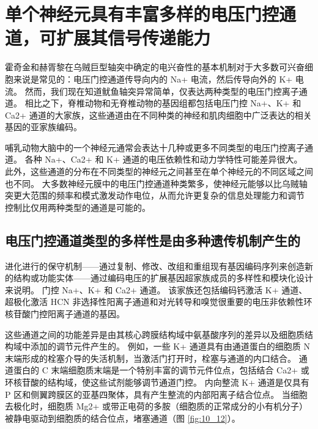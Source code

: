 \section{单个神经元具有丰富多样的电压门控通道，可扩展其信号传递能力}

霍奇金和赫胥黎在乌贼巨型轴突中确定的电兴奋性的基本机制对于大多数可兴奋细胞来说是常见的：电压门控通道传导向内的 Na+ 电流，然后传导向外的 K+ 电流。 
然而，我们现在知道鱿鱼轴突异常简单，仅表达两种类型的电压门控离子通道。 
相比之下，脊椎动物和无脊椎动物的基因组都包括电压门控 Na+、K+ 和 Ca2+ 通道的大家族，这些通道由在不同种类的神经和肌肉细胞中广泛表达的相关基因的亚家族编码。


哺乳动物大脑中的一个神经元通常会表达十几种或更多不同类型的电压门控离子通道。 
各种 Na+、Ca2+ 和 K+ 通道的电压依赖性和动力学特性可能差异很大。 
此外，这些通道的分布在不同类型的神经元之间甚至在单个神经元的不同区域之间也不同。 
大多数神经元膜中的电压门控通道种类繁多，使神经元能够以比乌贼轴突更大范围的频率和模式激发动作电位，从而允许更复杂的信息处理能力和调节 控制比仅用两种类型的通道是可能的。



\subsection{电压门控通道类型的多样性是由多种遗传机制产生的}
进化进行的保守机制——通过复制、修改、改组和重组现有基因编码序列来创造新的结构或功能实体——通过编码电压的扩展基因超家族成员的多样性和模块化设计来说明。 
门控 Na+、K+ 和 Ca2+ 通道。 该家族还包括编码钙激活 K+ 通道、超极化激活 HCN 非选择性阳离子通道和对光转导和嗅觉很重要的电压非依赖性环核苷酸门控阳离子通道的基因。


这些通道之间的功能差异是由其核心跨膜结构域中氨基酸序列的差异以及细胞质结构域中添加的调节元件产生的。 
例如，一些 K+ 通道具有由通道蛋白的细胞质 N 末端形成的栓塞介导的失活机制，当激活门打开时，栓塞与通道的内口结合。 
通道蛋白的 C 末端细胞质末端是一个特别丰富的调节元件位点，包括结合 Ca2+ 或环核苷酸的结构域，使这些试剂能够调节通道门控。 
内向整流 K+ 通道是仅具有 P 区和侧翼跨膜区的亚基四聚体，具有产生整流的内部阳离子结合位点。 
当细胞去极化时，细胞质 Mg2+ 或带正电荷的多胺（细胞质的正常成分的小有机分子）被静电驱动到细胞质的结合位点，堵塞通道（图 \ref{fig:10_12}）。

